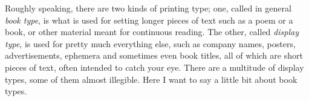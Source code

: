 \documentclass[10pt,a4paper,oneside,extrafontsizes]{memoir}%
\newcommand{\PWnote}[2]{}
\begin{document}
\PWnote{2009/04/25}{Added longish section on book types}
\PWnote{2009/04/25}{Used endnotes in book types section}

\begin{paracol}{2}
\switchEng
    Roughly speaking, there are two kinds of printing type;
one, called 
in general \emph{book type}, 
is what is used for setting longer pieces 
of text such as a poem or a book, or other material meant for continuous
reading. The other, called \emph{display type}, is used 
for pretty much everything else, such as company names, posters,
advertisements, ephemera and sometimes even book titles, all of which are 
short pieces of text, often intended to catch your eye. There are a multitude
of display types, some of them almost illegible. Here I want to say a little
bit about book types.
\end{paracol}
\end{document}
